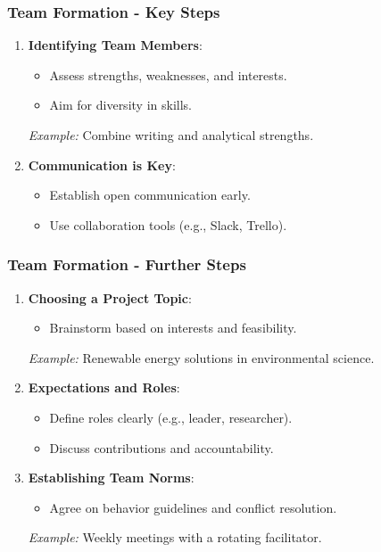 \documentclass{beamer}
\begin{document}
\begin{frame}[fragile]
    \frametitle{Team Formation - Key Steps}
    \begin{enumerate}
        \item \textbf{Identifying Team Members}:
            \begin{itemize}
                \item Assess strengths, weaknesses, and interests.
                \item Aim for diversity in skills.
            \end{itemize}
            \textit{Example:} Combine writing and analytical strengths.

        \item \textbf{Communication is Key}:
            \begin{itemize}
                \item Establish open communication early.
                \item Use collaboration tools (e.g., Slack, Trello).
            \end{itemize}
    \end{enumerate}
\end{frame}

\begin{frame}[fragile]
    \frametitle{Team Formation - Further Steps}
    \begin{enumerate}[resume]
        \item \textbf{Choosing a Project Topic}:
            \begin{itemize}
                \item Brainstorm based on interests and feasibility.
            \end{itemize}
            \textit{Example:} Renewable energy solutions in environmental science.

        \item \textbf{Expectations and Roles}:
            \begin{itemize}
                \item Define roles clearly (e.g., leader, researcher).
                \item Discuss contributions and accountability.
            \end{itemize}

        \item \textbf{Establishing Team Norms}:
            \begin{itemize}
                \item Agree on behavior guidelines and conflict resolution.
            \end{itemize}
            \textit{Example:} Weekly meetings with a rotating facilitator.
    \end{enumerate}
\end{frame}
\end{document}

